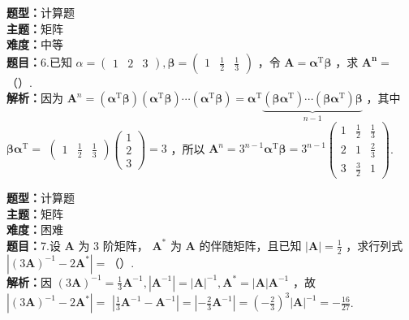 \documentclass{ctexart}
\newenvironment{question}[5]{%
	\noindent\textbf{题型：}#1\\
	\textbf{主题：}#2\\
	\textbf{难度：}#3\\
	\textbf{题目：}#4\\
	\textbf{解析：}#5\\
	\vspace{1em}
}{}
\begin{document}
	\begin{question}
		{计算题}
		{矩阵}
		{中等}
		{6.已知 \(\alpha=\left(\begin{array}{lll}1 & 2 & 3\end{array}\right), \boldsymbol{\beta}=\left(\begin{array}{lll}1 & \frac{1}{2} & \frac{1}{3}\end{array}\right)\) ，令 \(\mathbf{A}=\boldsymbol{\alpha}^{\mathrm{T}} \boldsymbol{\beta}\) ，求 \(\mathbf{A}^{\mathbf{n}}=\)（）. }
		{因为 \(\mathbf{A}^n=\left(\boldsymbol{\alpha}^{\mathrm{T}} \boldsymbol{\beta}\right)\left(\boldsymbol{\alpha}^{\mathrm{T}} \boldsymbol{\beta}\right) \cdots\left(\boldsymbol{\alpha}^{\mathrm{T}} \boldsymbol{\beta}\right)=\boldsymbol{\alpha}^{\mathrm{T}} \underbrace{\left(\boldsymbol{\beta} \boldsymbol{\alpha}^{\mathrm{T}}\right) \cdots\left(\boldsymbol{\beta} \boldsymbol{\alpha}^{\mathrm{T}}\right) \boldsymbol{\beta}}_{n-1 }\) ，其中 \(\boldsymbol{\beta} \boldsymbol{\alpha}^{\mathrm{T}}=\) \(\left(\begin{array}{lll}1 & \frac{1}{2} & \frac{1}{3}\end{array}\right)\left(\begin{array}{l}1 \\ 2 \\ 3\end{array}\right)=3\) ，所以 \(\mathbf{A}^n=3^{n-1} \boldsymbol{\alpha}^{\mathrm{T}} \boldsymbol{\beta}=3^{n-1}\left(\begin{array}{ccc}1 & \frac{1}{2} & \frac{1}{3} \\ 2 & 1 & \frac{2}{3} \\ 3 & \frac{3}{2} & 1\end{array}\right)\).}
	\end{question}
	
	\begin{question}
		{计算题}
		{矩阵}
		{困难}
		{7.设 \(\mathbf{A}\) 为 3 阶矩阵， \(\mathbf{A}^*\) 为 \(\mathbf{A}\) 的伴随矩阵，且已知 \(|\mathbf{A}|=\frac{1}{2}\) ，求行列式 \(\left|(3 \mathbf{A})^{-1}-2 \mathbf{A}^*\right|=\)（）. }
		{因 \((3 \mathbf{A})^{-1}=\frac{1}{3} \mathbf{A}^{-1},\left|\mathbf{A}^{-1}\right|=|\mathbf{A}|^{-1}, \mathbf{A}^*=|\mathbf{A}| \mathbf{A}^{-1}\) ，故 \(\left|(3 \mathbf{A})^{-1}-2 \mathbf{A}^*\right|=\) \(\left|\frac{1}{3} \mathbf{A}^{-1}-\mathbf{A}^{-1}\right|=\left|-\frac{2}{3} \mathbf{A}^{-1}\right|=\left(-\frac{2}{3}\right)^3|\mathbf{A}|^{-1}=-\frac{16}{27}\).}
	\end{question}
	
\end{document}
